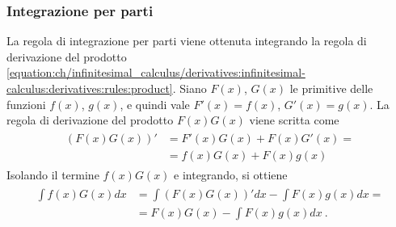 \documentclass[letterpaper,10pt,italian]{jupyterBook}
\begin{document}
\subsubsection{Integrazione per parti}
\label{\detokenize{ch/infinitesimal_calculus/integrals:integrazione-per-parti}}\label{\detokenize{ch/infinitesimal_calculus/integrals:infinitesimal-calculus-integrals-by-parts}}
\sphinxAtStartPar
La regola di integrazione per parti viene ottenuta integrando la regola di derivazione del prodotto \eqref{equation:ch/infinitesimal_calculus/derivatives:infinitesimal-calculus:derivatives:rules:product}. Siano \(F(x)\), \(G(x)\) le primitive delle funzioni \(f(x)\), \(g(x)\), e quindi vale \(F'(x) = f(x)\), \(G'(x) = g(x)\).
La regola di derivazione del prodotto \(F(x)G(x)\) viene scritta come
\begin{equation*}
\begin{split}\begin{aligned}
  (F(x) G(x))' & = F'(x) G(x) + F(x) G'(x) = \\
  & = f(x) G(x) + F(x) g(x)
\end{aligned}\end{split}
\end{equation*}
\sphinxAtStartPar
Isolando il termine \(f(x)G(x)\) e integrando, si ottiene
\begin{equation*}
\begin{split}\begin{aligned}
\int f(x) G(x) dx & = \int (F(x) G(x))' dx - \int F(x) g(x) dx = \\
& = F(x) G(x) - \int F(x) g(x) dx  \ .
\end{aligned}\end{split}
\end{equation*}
\end{document}
